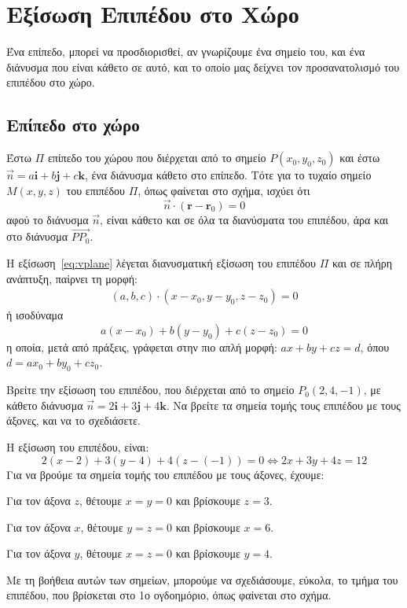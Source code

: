 \chapter*{Εξίσωση Επιπέδου στο Χώρο}

Ένα επίπεδο, μπορεί να προσδιορισθεί, αν γνωρίζουμε ένα σημείο του, και ένα 
διάνυσμα που είναι κάθετο σε αυτό, και το οποίο μας δείχνει τον προσανατολισμό του 
επιπέδου στο χώρο.

\section*{Επίπεδο στο χώρο}

Έστω $ \Pi $ επίπεδο του χώρου που διέρχεται από το σημείο $ P(x_{0}, y_{0}, z_{0}) $ 
και έστω $ \vec{n} = a \mathbf{i} + b \mathbf{j} + c \mathbf{k} $, ένα διάνυσμα κάθετο 
στο επίπεδο. Τότε για το τυχαίο σημείο $ M(x,y,z) $ του επιπέδου $ \Pi $, όπως φαίνεται 
στο σχήμα, ισχύει ότι 
\begin{equation}\label{eq:vplane}
  \vec{n} \cdot (\mathbf{r} - \mathbf{r}_{0}) = 0
\end{equation} 
αφού το διάνυσμα $ \vec{n} $, είναι κάθετο και σε όλα τα διανύσματα του επιπέδου, άρα 
και στο διάνυσμα $ \vec{PP_{0}} $. 

Η εξίσωση~\eqref{eq:vplane} λέγεται \textcolor{Col1}{διανυσματική} εξίσωση του 
επιπέδου $ \Pi $ και σε πλήρη ανάπτυξη, παίρνει τη μορφή:
\begin{align*}
  (a,b,c) \cdot (x- x_{0}, y- y_{0}, z- z_{0}) = 0 
\end{align*} 
ή ισοδύναμα
\begin{equation}
  \boxed{a(x- x_{0}) + b(y- y_{0}) + c(z- z_{0}) = 0}
\end{equation}
η οποία, μετά από πράξεις, γράφεται στην πιο απλή μορφή:
$ ax+by+cz=d $, όπου $ d=a x_{0}+ b y_{0}+cz_{0} $.



\begin{example}
  Βρείτε την εξίσωση του επιπέδου, που διέρχεται από το σημείο $ P_{0}(2,4,-1) $, με 
  κάθετο διάνυσμα $ \vec{n} = 2 \mathbf{i} + 3 \mathbf{j} + 4 \mathbf{k} $. Να βρείτε 
  τα σημεία τομής τους επιπέδου με τους άξονες, και να το σχεδιάσετε.
\end{example}
\begin{solution}
  Η εξίσωση του επιπέδου, είναι:
  \[
    2(x-2)+3(y-4)+4(z-(-1)) = 0 \Leftrightarrow 2x+3y+4z=12
  \]
  Για να βρούμε τα σημεία τομής του επιπέδου με τους άξονες, έχουμε:
  \begin{myitemize}
    \item Για τον άξονα $z$, θέτουμε $ x=y=0 $ και βρίσκουμε $ z=3 $.
    \item Για τον άξονα $x$, θέτουμε $ y=z=0 $ και βρίσκουμε $ x=6 $.
    \item Για τον άξονα $y$, θέτουμε $ x=z=0 $ και βρίσκουμε $ y=4 $.
  \end{myitemize}
  Με τη βοήθεια αυτών των σημείων, μπορούμε να σχεδιάσουμε, εύκολα, το τμήμα του 
  επιπέδου, που βρίσκεται στο 1ο ογδοημόριο, όπως φαίνεται στο σχήμα.
\end{solution}

